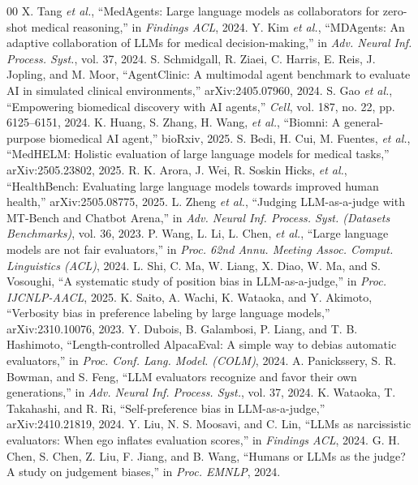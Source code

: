 \documentclass[conference]{IEEEtran}
\begin{document}
\begin{thebibliography}{00}
 X. Tang \textit{et al.}, ``MedAgents: Large language models as collaborators for zero-shot medical reasoning,'' in \textit{Findings ACL}, 2024.
 Y. Kim \textit{et al.}, ``MDAgents: An adaptive collaboration of LLMs for medical decision-making,'' in \textit{Adv. Neural Inf. Process. Syst.}, vol. 37, 2024.
 S. Schmidgall, R. Ziaei, C. Harris, E. Reis, J. Jopling, and M. Moor, ``AgentClinic: A multimodal agent benchmark to evaluate AI in simulated clinical environments,'' arXiv:2405.07960, 2024.
 S. Gao \textit{et al.}, ``Empowering biomedical discovery with AI agents,'' \textit{Cell}, vol. 187, no. 22, pp. 6125--6151, 2024.
 K. Huang, S. Zhang, H. Wang, \textit{et al.}, ``Biomni: A general-purpose biomedical AI agent,'' bioRxiv, 2025.
 S. Bedi, H. Cui, M. Fuentes, \textit{et al.}, ``MedHELM: Holistic evaluation of large language models for medical tasks,'' arXiv:2505.23802, 2025.
 R. K. Arora, J. Wei, R. Soskin Hicks, \textit{et al.}, ``HealthBench: Evaluating large language models towards improved human health,'' arXiv:2505.08775, 2025.
 L. Zheng \textit{et al.}, ``Judging LLM-as-a-judge with MT-Bench and Chatbot Arena,'' in \textit{Adv. Neural Inf. Process. Syst. (Datasets Benchmarks)}, vol. 36, 2023.
 P. Wang, L. Li, L. Chen, \textit{et al.}, ``Large language models are not fair evaluators,'' in \textit{Proc. 62nd Annu. Meeting Assoc. Comput. Linguistics (ACL)}, 2024.
 L. Shi, C. Ma, W. Liang, X. Diao, W. Ma, and S. Vosoughi, ``A systematic study of position bias in LLM-as-a-judge,'' in \textit{Proc. IJCNLP-AACL}, 2025.
 K. Saito, A. Wachi, K. Wataoka, and Y. Akimoto, ``Verbosity bias in preference labeling by large language models,'' arXiv:2310.10076, 2023.
 Y. Dubois, B. Galambosi, P. Liang, and T. B. Hashimoto, ``Length-controlled AlpacaEval: A simple way to debias automatic evaluators,'' in \textit{Proc. Conf. Lang. Model. (COLM)}, 2024.
 A. Panickssery, S. R. Bowman, and S. Feng, ``LLM evaluators recognize and favor their own generations,'' in \textit{Adv. Neural Inf. Process. Syst.}, vol. 37, 2024.
 K. Wataoka, T. Takahashi, and R. Ri, ``Self-preference bias in LLM-as-a-judge,'' arXiv:2410.21819, 2024.
 Y. Liu, N. S. Moosavi, and C. Lin, ``LLMs as narcissistic evaluators: When ego inflates evaluation scores,'' in \textit{Findings ACL}, 2024.
 G. H. Chen, S. Chen, Z. Liu, F. Jiang, and B. Wang, ``Humans or LLMs as the judge? A study on judgement biases,'' in \textit{Proc. EMNLP}, 2024.

\end{thebibliography}
\end{document}
